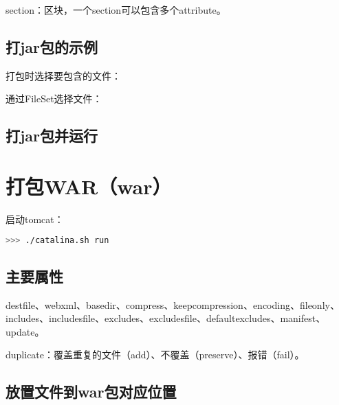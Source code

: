 section：区块，一个section可以包含多个attribute。





\subsection{打jar包的示例}

打包时选择要包含的文件：



通过FileSet选择文件：



\subsection{打jar包并运行}









\section{打包WAR（war）}

启动tomcat：

\begin{lstlisting}[language=Bash]
>>> ./catalina.sh run
\end{lstlisting}


\subsection{主要属性}

destfile、webxml、basedir、compress、keepcompression、encoding、fileonly、includes、includesfile、excludes、excludesfile、defaultexcludes、manifest、update。

duplicate：覆盖重复的文件（add）、不覆盖（preserve）、报错（fail）。

\subsection{放置文件到war包对应位置}



